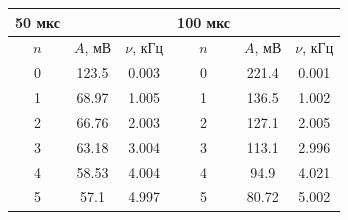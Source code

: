 \documentclass[a4paper, 14pt]{extarticle}%
\begin{document}
\begin{table}[h!]
\begin{center}
\begin{tabular}{|c|c|c|ccc}
\hline
50 мкс                     &                               &                               & \multicolumn{1}{c|}{100 мкс}                   & \multicolumn{1}{c|}{}                              & \multicolumn{1}{c|}{}                                 \\ \hline
\rowcolor[HTML]{9698ED} 
$n$                          & $A$, мВ                         & $\nu$, кГц                      & \multicolumn{1}{c|}{\cellcolor[HTML]{9698ED}$n$} & \multicolumn{1}{c|}{\cellcolor[HTML]{9698ED}$A$, мВ} & \multicolumn{1}{c|}{\cellcolor[HTML]{9698ED}$\nu$, кГц} \\ \hline
0                          & 123.5                         & 0.003                         & \multicolumn{1}{c|}{0}                         & \multicolumn{1}{c|}{221.4}                         & \multicolumn{1}{c|}{0.001}                            \\ \hline
\rowcolor[HTML]{9698ED} 
1                          & 68.97                         & 1.005                         & \multicolumn{1}{c|}{\cellcolor[HTML]{9698ED}1} & \multicolumn{1}{c|}{\cellcolor[HTML]{9698ED}136.5} & \multicolumn{1}{c|}{\cellcolor[HTML]{9698ED}1.002}    \\ \hline
2                          & 66.76                         & 2.003                         & \multicolumn{1}{c|}{2}                         & \multicolumn{1}{c|}{127.1}                         & \multicolumn{1}{c|}{2.005}                            \\ \hline
\rowcolor[HTML]{9698ED} 
3                          & 63.18                         & 3.004                         & \multicolumn{1}{c|}{\cellcolor[HTML]{9698ED}3} & \multicolumn{1}{c|}{\cellcolor[HTML]{9698ED}113.1} & \multicolumn{1}{c|}{\cellcolor[HTML]{9698ED}2.996}    \\ \hline
4                          & 58.53                         & 4.004                         & \multicolumn{1}{c|}{4}                         & \multicolumn{1}{c|}{94.9}                          & \multicolumn{1}{c|}{4.021}                            \\ \hline
\rowcolor[HTML]{9698ED} 
5                          & 57.1                          & 4.997                         & \multicolumn{1}{c|}{\cellcolor[HTML]{9698ED}5} & \multicolumn{1}{c|}{\cellcolor[HTML]{9698ED}80.72} & \multicolumn{1}{c|}{\cellcolor[HTML]{9698ED}5.002}    \\ \hline

\end{tabular}
\end{center}
\end{table}
\end{document}
